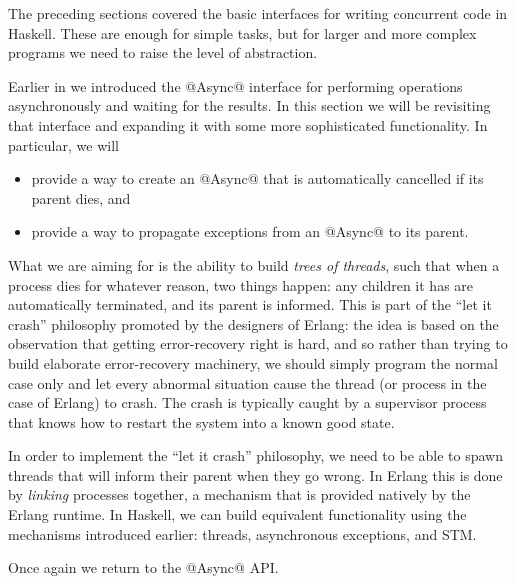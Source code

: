 
The preceding sections covered the basic interfaces for writing
concurrent code in Haskell.  These are enough for simple tasks, but
for larger and more complex programs we need to raise the level of
abstraction.

Earlier in  we introduced the @Async@ interface for
performing operations asynchronously and waiting for the results.  In
this section we will be revisiting that interface and expanding it
with some more sophisticated functionality.  In particular, we will

\begin{itemize}
\item provide a way to create an @Async@ that is automatically
  cancelled if its parent dies, and
\item provide a way to propagate exceptions
  from an @Async@ to its parent.
\end{itemize}

What we are aiming for is the ability to build \emph{trees of
  threads}, such that when a process dies for whatever reason, two
things happen: any children it has are automatically terminated, and
its parent is informed.  This is part of the ``let it crash''
philosophy promoted by the designers of Erlang: the idea is based on
the observation that getting error-recovery right is hard, and so
rather than trying to build elaborate error-recovery machinery, we
should simply program the normal case only and let every abnormal situation
cause the thread (or process in the case of Erlang) to crash.  The
crash is typically caught by a supervisor process that knows how to
restart the system into a known good state.

In order to implement the ``let it crash'' philosophy, we need to be
able to spawn threads that will inform their parent when they go
wrong.  In Erlang this is done by \emph{linking} processes together, a
mechanism that is provided natively by the Erlang runtime.  In
Haskell, we can build equivalent functionality using the mechanisms
introduced earlier: threads, asynchronous exceptions, and STM.

Once again we return to the @Async@ API.
